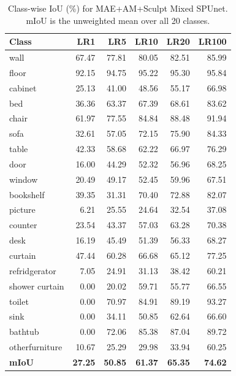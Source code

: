\begin{table}[htbp]
\centering
\caption{Class-wise IoU (\%) for MAE+AM+Sculpt Mixed SPUnet. mIoU is the unweighted mean over all 20 classes.}
\label{tab:classwise-FT-sculptor-spunet}
\begin{tabular}{lrrrrr}
\hline
Class & LR1 & LR5 & LR10 & LR20 & LR100 \\
\hline
wall & 67.47 & 77.81 & 80.05 & 82.51 & 85.99 \\
floor & 92.15 & 94.75 & 95.22 & 95.30 & 95.84 \\
cabinet & 25.13 & 41.00 & 48.56 & 55.17 & 66.98 \\
bed & 36.36 & 63.37 & 67.39 & 68.61 & 83.62 \\
chair & 61.97 & 77.55 & 84.84 & 88.48 & 91.94 \\
sofa & 32.61 & 57.05 & 72.15 & 75.90 & 84.33 \\
table & 42.33 & 58.68 & 62.22 & 66.97 & 76.29 \\
door & 16.00 & 44.29 & 52.32 & 56.96 & 68.25 \\
window & 20.49 & 49.17 & 52.45 & 59.96 & 67.51 \\
bookshelf & 39.35 & 31.31 & 70.40 & 72.88 & 82.07 \\
picture & 6.21 & 25.55 & 24.64 & 32.54 & 37.08 \\
counter & 23.54 & 43.37 & 57.03 & 63.28 & 70.38 \\
desk & 16.19 & 45.49 & 51.39 & 56.33 & 68.27 \\
curtain & 47.44 & 60.28 & 66.68 & 65.12 & 77.25 \\
refridgerator & 7.05 & 24.91 & 31.13 & 38.42 & 60.21 \\
shower curtain & 0.00 & 20.02 & 59.71 & 55.77 & 66.55 \\
toilet & 0.00 & 70.97 & 84.91 & 89.19 & 93.27 \\
sink & 0.00 & 34.11 & 50.85 & 62.64 & 66.60 \\
bathtub & 0.00 & 72.06 & 85.38 & 87.04 & 89.72 \\
otherfurniture & 10.67 & 25.29 & 29.98 & 33.94 & 60.25 \\
\hline
\textbf{mIoU} & \textbf{27.25} & \textbf{50.85} & \textbf{61.37} & \textbf{65.35} & \textbf{74.62} \\
\hline
\end{tabular}
\end{table}
